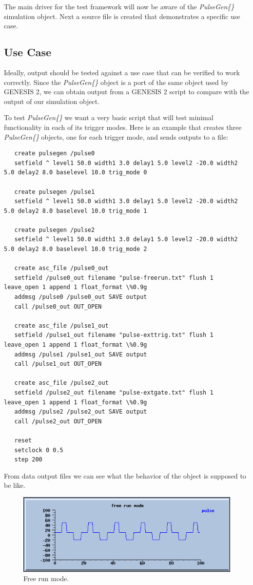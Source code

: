 \documentclass[12pt]{article}
\begin{document}
The main driver for the test framework will now be aware of the {\it PulseGen\{\}} simulation object. Next a source file is created that demonstrates a specific use case.

\subsection*{Use Case}

Ideally, output should be tested against a use case that can be verified to work correctly. Since the {\it PulseGen\{\}} object is a port of the same object used by GENESIS 2, we can obtain output from a GENESIS 2 script to compare with the output of our simulation object.

To test {\it PulseGen\{\}} we want a very basic script that will test minimal functionality in each of its trigger modes. Here is an example that creates three {\it PulseGen\{\}} objects, one for each trigger mode, and sends outputs to a file:
\begin{verbatim}
   create pulsegen /pulse0
   setfield ^ level1 50.0 width1 3.0 delay1 5.0 level2 -20.0 width2 5.0 delay2 8.0 baselevel 10.0 trig_mode 0

   create pulsegen /pulse1
   setfield ^ level1 50.0 width1 3.0 delay1 5.0 level2 -20.0 width2 5.0 delay2 8.0 baselevel 10.0 trig_mode 1

   create pulsegen /pulse2
   setfield ^ level1 50.0 width1 3.0 delay1 5.0 level2 -20.0 width2 5.0 delay2 8.0 baselevel 10.0 trig_mode 2

   create asc_file /pulse0_out 
   setfield /pulse0_out filename "pulse-freerun.txt" flush 1 leave_open 1 append 1 float_format \%0.9g
   addmsg /pulse0 /pulse0_out SAVE output
   call /pulse0_out OUT_OPEN

   create asc_file /pulse1_out 
   setfield /pulse1_out filename "pulse-exttrig.txt" flush 1 leave_open 1 append 1 float_format \%0.9g
   addmsg /pulse1 /pulse1_out SAVE output
   call /pulse1_out OUT_OPEN

   create asc_file /pulse2_out 
   setfield /pulse2_out filename "pulse-extgate.txt" flush 1 leave_open 1 append 1 float_format \%0.9g
   addmsg /pulse2 /pulse2_out SAVE output
   call /pulse2_out OUT_OPEN

   reset
   setclock 0 0.5
   step 200
\end{verbatim}

From data output files we can see what the behavior of the object is supposed to be like.

\begin{figure}[ht]
  \centering
    \includegraphics[scale=0.4]{figures/pulse0.png}
  \caption{Free run mode.}
\end{figure}
\end{document}
